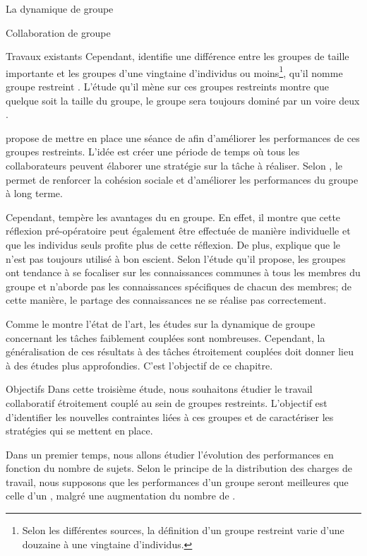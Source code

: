 \documentclass[myfrancais,ngerman,english,french]{mythesis}
\begin{document}
\begin{mychapter}{La dynamique de groupe}
\begin{mysection}{Collaboration de groupe}
\begin{mysubsection}{Travaux existants}
				Cependant,  identifie une différence entre les groupes de taille importante et les groupes d'une vingtaine d'individus ou moins\footnote{Selon les différentes sources, la définition d'un groupe restreint varie d'une douzaine à une vingtaine d'individus.}, qu'il nomme \og groupe restreint \fg.
				L'étude qu'il mène sur ces groupes restreints montre que quelque soit la taille du groupe, le groupe sera toujours dominé par un voire deux .

				 propose de mettre en place une séance de \mybrainstorming afin d'améliorer les performances de ces groupes restreints.
				L'idée est créer une période de temps où tous les collaborateurs peuvent élaborer une stratégie sur la tâche à réaliser.
				Selon , le \mybrainstorming permet de renforcer la cohésion sociale et d'améliorer les performances du groupe à long terme.

				Cependant,  tempère les avantages du \mybrainstorming en groupe.
				En effet, il montre que cette réflexion pré-opératoire peut également être effectuée de manière individuelle et que les individus seuls profite plus de cette réflexion.
				De plus,  explique que le \mybrainstorming n'est pas toujours utilisé à bon escient.
				Selon l'étude qu'il propose, les groupes ont tendance à se focaliser sur les connaissances communes à tous les membres du groupe et n'aborde pas les connaissances spécifiques de chacun des membres; de cette manière, le partage des connaissances ne se réalise pas correctement.

				Comme le montre l'état de l'art, les études sur la dynamique de groupe concernant les tâches faiblement couplées sont nombreuses.
				Cependant, la généralisation de ces résultats à des tâches étroitement couplées doit donner lieu à des études plus approfondies.
				C'est l'objectif de ce chapitre.
			\end{mysubsection}
			\begin{mysubsection}{Objectifs}
				Dans cette troisième étude, nous souhaitons étudier le travail collaboratif étroitement couplé au sein de groupes restreints.
				L'objectif est d'identifier les nouvelles contraintes liées à ces groupes et de caractériser les stratégies qui se mettent en place.

				Dans un premier temps, nous allons étudier l'évolution des performances en fonction du nombre de sujets.
				Selon le principe de la distribution des charges de travail, nous supposons que les performances d'un groupe seront meilleures que celle d'un , malgré une augmentation du nombre de .


\end{mysubsection}
\end{mysection}
\end{mychapter}
\end{document}
